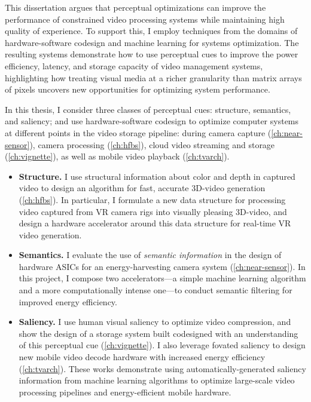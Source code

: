 This dissertation argues that perceptual optimizations can improve the performance of constrained video processing systems while maintaining high quality of experience.
To support this, I employ techniques from the domains of hardware-software codesign and machine learning for systems optimization.
The resulting systems demonstrate how to use perceptual cues to improve the power efficiency, latency, and storage capacity of video management systems, highlighting how treating visual media at a richer granularity than matrix arrays of pixels uncovers new opportunities for optimizing system performance.

In this thesis, I consider three classes of perceptual cues: structure, semantics, and saliency; and use hardware-software codesign to optimize computer systems at different points in the video storage pipeline: during camera capture (\ref{ch:near-sensor}), camera processing (\ref{ch:hfbs}), cloud video streaming and storage (\ref{ch:vignette}), as well as mobile video playback (\ref{ch:tvarch}).

\begin{itemize}
\item \textbf{Structure.} I use structural information about color and depth in captured video to design an algorithm for fast, accurate 3D-\threesixty video generation (\ref{ch:hfbs}).
In particular, I formulate a new data structure for processing video captured from VR camera rigs into visually pleasing 3D-\threesixty video, and design a hardware accelerator around this data structure for real-time VR video generation.

\item \textbf{Semantics.} I evaluate the use of \emph{semantic information} in the design of hardware ASICs for an energy-harvesting camera system (\ref{ch:near-sensor}).
In this project, I compose two accelerators---a simple machine learning algorithm and a more computationally intense one---to conduct semantic filtering for improved energy efficiency.

\item \textbf{Saliency.} I use human visual saliency to optimize video compression, and show the design of a storage system built codesigned with an understanding of this perceptual cue (\ref{ch:vignette}).
I also leverage fovated saliency to design new mobile video decode hardware with increased energy efficiency (\ref{ch:tvarch}).
These works demonstrate using automatically-generated saliency information from machine learning algorithms to optimize large-scale video processing pipelines and energy-efficient mobile hardware.
\end{itemize}


